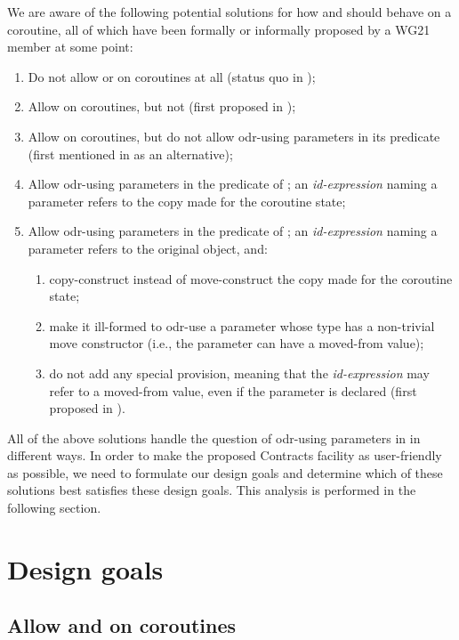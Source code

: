 We are aware of the following potential solutions for how  and  should behave on a coroutine, all of which have been formally or informally proposed by a WG21 member at some point:
\begin{enumerate}
\item Do not allow  or  on coroutines at all (status quo in \cite{P2900R8});
\item Allow  on coroutines, but not  (first proposed in \cite{P2957R1});
\item Allow  on coroutines, but do not allow odr-using parameters in its predicate (first mentioned in \cite{P2957R1} as an alternative);
\item Allow odr-using parameters in the predicate of ; an \emph{id-expression} naming a parameter refers to the copy made for the coroutine state;
\item Allow odr-using parameters in the predicate of ; an \emph{id-expression} naming a parameter refers to the original object, and:
\begin{enumerate}[label=\alph*.,ref=\theenumi\alph*]
        \item copy-construct instead of move-construct the copy made for the coroutine state;
        \item make it ill-formed to odr-use a parameter whose type has a non-trivial move constructor (i.e., the parameter can have a moved-from value);
        \item do not add any special provision, meaning that the \emph{id-expression} may refer to a moved-from value, even if the parameter is declared  (first proposed in \cite{P2957R0}).
\end{enumerate}
\end{enumerate}
All of the above solutions handle the question of odr-using parameters in  in different ways. In order to make the proposed Contracts facility as user-friendly as possible, we need to formulate our design goals and determine which of these solutions best satisfies these design goals. This analysis is performed in the following section.

\section{Design goals}

\subsection{Allow  and  on coroutines}


